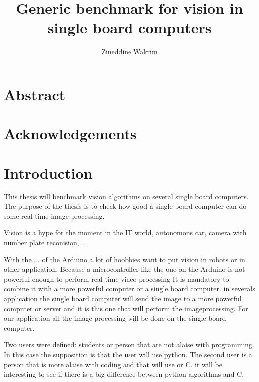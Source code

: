 \documentclass[english]{book_template} %
\title{Generic benchmark for vision in single board computers}
\author {Zineddine Wakrim} %
\begin{document}
\maketitle
\newpage
  \null
\chapter*{Abstract}
\newpage
  \null
\chapter*{Acknowledgements}

\newpage
  \null

\tableofcontents
\listoffigures
\listoftables

\newpage
  \null

\chapter{Introduction} %

This thesis will benchmark vision algorithms on several single board computers. The purpose of the thesis is to check how good a single board computer can do some real time image processing. 

Vision is a hype for the moment in the IT world, autonomous car, camera with number plate reconision,...

With the ... of the Arduino a lot of hoobbies want to put vision in robots or in other application. Because a microcontroller like the one on the Arduino is not powerful enough to perform real time video processing It is mandatory to combine it with a more powerful computer or a single board computer. in severals application the single board computer will send the image to a more powerful computer or server and it is this one that will perform the imageprocessing. For our application all the image processing will be done on the single board computer.

Two users were defined: students or person that are not alaise with programming. In this case the supposition is that the user will use python. The second user is a person that is more alaise with coding and that will use or C. it will be interesting to see if there is a big difference between python algorithms and C. 
\end{document}
